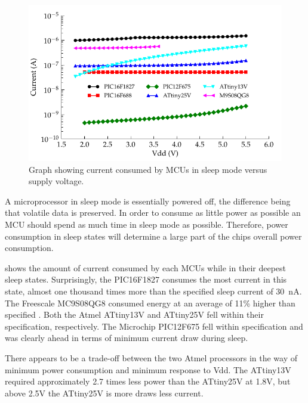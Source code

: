       \begin{figure}
        \centering
        \includegraphics{content/pt1/03-EnergyRequirements/graphics/Graph_All_Sleeping_Current}
        \caption{\label{fig:All_Sleep_Current}Graph showing current consumed by MCUs in sleep mode versus supply voltage.}
      \end{figure}

      A microprocessor in sleep mode is essentially powered off, the difference being that volatile data is preserved.
      In order to consume as little power as possible an MCU should spend as much time in sleep mode as possible.
      Therefore, power consumption in sleep states will determine a large part of the chips overall power consumption.

       shows the amount of current consumed by each MCUs while in their deepest sleep states.
      Surprisingly, the PIC16F1827 consumes the most current in this state, almost one thousand times more than the specified sleep current of \SI{30}{\nano\ampere}\cite{PIC16F1827}.
      The Freescale MC9S08QG8 consumed energy at an average of 11\% higher than specified \cite{MC9S08QG8}.
      Both the Atmel ATtiny13V and ATtiny25V fell within their specification, \cite{AtmelATtiny13,AtmelATtiny25} respectively.
      The Microchip PIC12F675 fell within specification\cite{PIC12F675} and was clearly ahead in terms of minimum current draw during sleep.

      There appears to be a trade-off between the two Atmel processors in the way of minimum power consumption and minimum response to Vdd.
      The ATtiny13V required approximately 2.7 times less power than the ATtiny25V at 1.8V, but above 2.5V the ATtiny25V is more draws less current.

